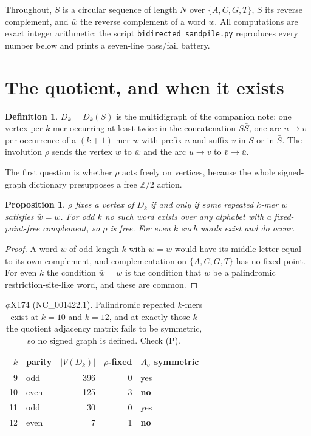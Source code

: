 \documentclass[11pt]{article}
\theoremstyle{plain}
\newtheorem{proposition}[theorem]{Proposition}
\theoremstyle{definition}
\newtheorem{definition}[theorem]{Definition}
\theoremstyle{remark}
\newcommand{\Z}{\mathbb{Z}}
\begin{document}
Throughout, $S$ is a circular sequence of length $N$ over $\{A,C,G,T\}$, $\bar S$ its reverse
complement, and $\bar w$ the reverse complement of a word $w$. All computations are exact
integer arithmetic; the script \texttt{bidirected\_sandpile.py} reproduces every number below
and prints a seven-line pass/fail battery.

\section{The quotient, and when it exists}

\begin{definition}
$D_k=D_k(S)$ is the multidigraph of the companion note: one vertex per $k$-mer occurring at
least twice in the concatenation $S\bar S$, one arc $u\to v$ per occurrence of a
$(k{+}1)$-mer $w$ with prefix $u$ and suffix $v$ in $S$ or in $\bar S$. The involution
$\rho$ sends the vertex $w$ to $\bar w$ and the arc $u\to v$ to $\bar v\to\bar u$.
\end{definition}

The first question is whether $\rho$ acts freely on vertices, because the whole signed-graph
dictionary presupposes a free $\Z/2$ action.

\begin{proposition}\label{prop:parity}
$\rho$ fixes a vertex of $D_k$ if and only if some repeated $k$-mer $w$ satisfies
$\bar w=w$. For odd $k$ no such word exists over any alphabet with a fixed-point-free
complement, so $\rho$ is free. For even $k$ such words exist and do occur.
\end{proposition}

\begin{proof}
A word $w$ of odd length $k$ with $\bar w=w$ would have its middle letter equal to its own
complement, and complementation on $\{A,C,G,T\}$ has no fixed point. For even $k$ the
condition $\bar w=w$ is the condition that $w$ be a palindromic restriction-site-like word,
and these are common.
\end{proof}

\begin{table}[t]
\centering
\begin{tabular}{rlrrl}
\toprule
$k$ & parity & $|V(D_k)|$ & $\rho$-fixed & $A_\sigma$ symmetric\\
\midrule
 9 & odd  & 396 & 0 & yes\\
10 & even & 125 & 3 & \textbf{no}\\
11 & odd  &  30 & 0 & yes\\
12 & even &   7 & 1 & \textbf{no}\\
\bottomrule
\end{tabular}
\caption{$\phi$X174 (NC\_001422.1). Palindromic repeated $k$-mers exist at $k=10$ and
$k=12$, and at exactly those $k$ the quotient adjacency matrix fails to be symmetric, so no
signed graph is defined. Check (P).}
\label{tab:parity}
\end{table}
\end{document}
